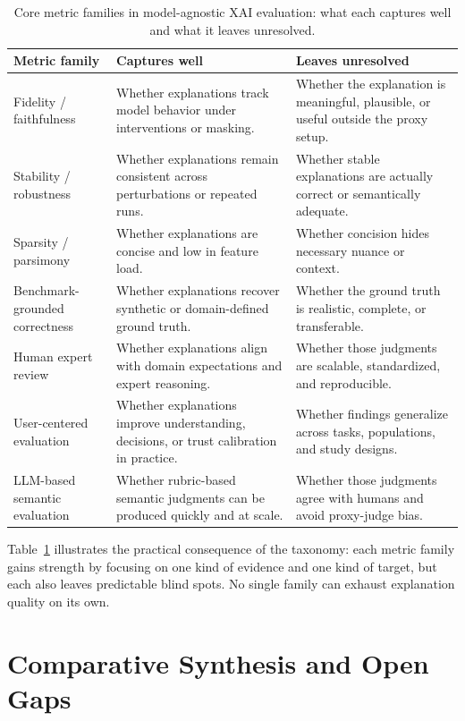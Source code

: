 \documentclass[twoside,11pt]{article}
\begin{document}
\begin{table}[t]
\centering
\caption{Core metric families in model-agnostic XAI evaluation: what
each captures well and what it leaves unresolved.}
\footnotesize
\begin{tabularx}{\linewidth}{l X X}
\toprule
\textbf{Metric family} & \textbf{Captures well} & \textbf{Leaves unresolved} \\
\midrule
Fidelity / faithfulness & Whether explanations track model behavior under interventions or masking. & Whether the explanation is meaningful, plausible, or useful outside the proxy setup. \\
Stability / robustness & Whether explanations remain consistent across perturbations or repeated runs. & Whether stable explanations are actually correct or semantically adequate. \\
Sparsity / parsimony & Whether explanations are concise and low in feature load. & Whether concision hides necessary nuance or context. \\
Benchmark-grounded correctness & Whether explanations recover synthetic or domain-defined ground truth. & Whether the ground truth is realistic, complete, or transferable. \\
Human expert review & Whether explanations align with domain expectations and expert reasoning. & Whether those judgments are scalable, standardized, and reproducible. \\
User-centered evaluation & Whether explanations improve understanding, decisions, or trust calibration in practice. & Whether findings generalize across tasks, populations, and study designs. \\
LLM-based semantic evaluation & Whether rubric-based semantic judgments can be produced quickly and at scale. & Whether those judgments agree with humans and avoid proxy-judge bias. \\
\bottomrule
\end{tabularx}
\label{tab:taxonomy_families}
\end{table}

Table~\ref{tab:taxonomy_families} illustrates the practical consequence of
the taxonomy: each metric family gains strength by focusing on one kind
of evidence and one kind of target, but each also leaves predictable
blind spots. No single family can exhaust explanation quality on its own.

\section{Comparative Synthesis and Open Gaps}
\label{sec:synthesis}
\end{document}
